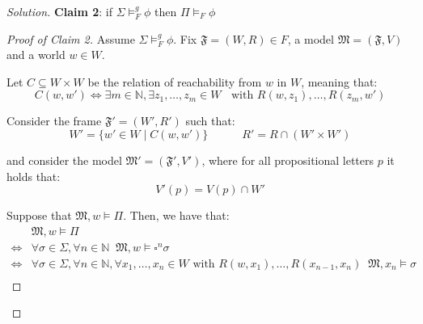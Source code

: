 \documentclass[12pt,a4paper]{report}
\theoremstyle{definition}
\newcommand{\N}{\mathbb{N}}                     %
\newcommand{\model}[1]{\mathfrak{#1}}           %
\begin{document}
\begin{proof}[Solution]
        \textbf{Claim 2}: if $\Sigma \models^g_F \phi$ then $\Pi \models_F \phi$

        \begin{proof}[Proof of Claim 2]
            Assume $\Sigma \models^g_F \phi$. Fix $\model{F} = (W,R)\in F$, a model $\model{M} = (\model F, V)$ and a world $w \in W$.

            Let $C \subseteq W \times W$ be the relation of reachability from $w$ in $W$, meaning that:
            \[C(w,w') \iff \exists m \in \N, \exists z_1, \ldots, z_{m} \in W \;\; \text{ with } R(w, z_1), \ldots, R(z_{m}, w')\]

            Consider the frame $\model{F}' = (W', R')$ such that:
            \[W' = \{w' \in W \mid C(w,w')\} \qquad\quad R' = R \cap (W' \times W')\]

            and consider the model $\model{M}' = (\model F', V')$, where for all propositional letters $p$ it holds that:
            \[V'(p) = V(p) \cap W'\]

            Suppose that $\model M, w \models \Pi$. Then, we have that:
            \[\begin{split}
                & \model M, w \models \Pi \\
                \iff & \forall \sigma \in \Sigma, \forall n \in \N \;\; \model M, w \models \square^n \sigma \\
                \iff & \forall \sigma \in \Sigma, \forall n \in \N, \forall x_1, \ldots, x_n \in W  \text{ with } R(w, x_1), \ldots, R(x_{n-1}, x_n)\;\; \model M, x_n \models \sigma \\
            \end{split}\]


\end{proof}
\end{proof}
\end{document}
